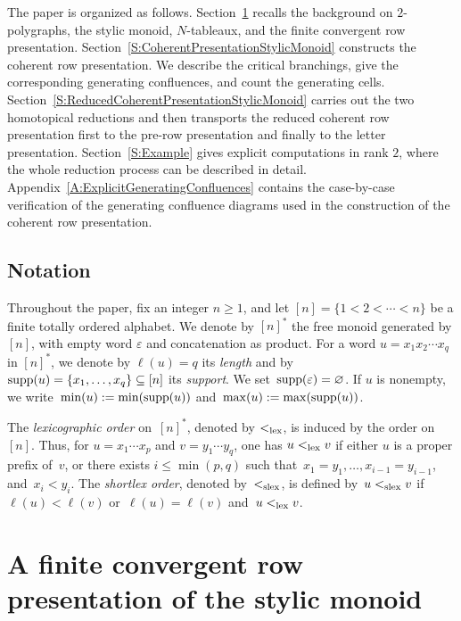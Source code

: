 \documentclass[a4paper, twoside, 11pt, english]{article}
\begin{document}
The paper is organized as follows. Section~\ref{S:RowPresentationStylicMonoid} recalls the background on
$2$-polygraphs, the stylic monoid, $N$-tableaux, and the finite convergent row
presentation. 
Section~\ref{S:CoherentPresentationStylicMonoid} constructs the coherent row
presentation. We describe the critical branchings, give the corresponding
generating confluences, and count the generating cells.
Section~\ref{S:ReducedCoherentPresentationStylicMonoid} carries out the two
homotopical reductions and then transports the reduced coherent row presentation
first to the pre-row presentation and finally to the letter presentation.
Section~\ref{S:Example} gives explicit computations in rank $2$, where the whole
reduction process can be described in detail. 
Appendix~\ref{A:ExplicitGeneratingConfluences} contains the
case-by-case verification of the generating confluence diagrams used in the
construction of the coherent row presentation.


\subsection*{Notation}

Throughout the paper, fix an integer $n\geq 1$, and let $[n]=\{1<2<\cdots<n\}$ be a finite totally ordered alphabet. We denote by $[n]^\ast$ the free monoid generated by $[n]$, with empty word $\varepsilon$ and concatenation as product. For a word $u=x_1x_2\cdots x_q$ in $[n]^\ast$, we denote by $\ell(u)=q$ its \emph{length} and by~$\operatorname{supp}(u)=\{x_1,\dots,x_q\}\subseteq [n]$ its \emph{support}. We set~$\operatorname{supp}(\varepsilon)=\varnothing$. If $u$ is nonempty, we write~$\min(u):=\min(\operatorname{supp}(u))$ and~$\max(u):=\max(\operatorname{supp}(u))$.

The \emph{lexicographic order} on~$[n]^\ast$, denoted by
$<_{\mathrm{lex}}$, is induced by the order on~$[n]$. Thus, for
$u=x_1\cdots x_p$ and $v=y_1\cdots y_q$, one has
$u<_{\mathrm{lex}}v$ if either $u$ is a proper prefix of~$v$, or there exists
$i\leq\min(p,q)$ such that~$
x_1=y_1,\ldots,x_{i-1}=y_{i-1}$, and~$x_i<y_i$.
The \emph{shortlex order}, denoted by~$<_{\mathrm{slex}}$, is defined by~$u<_{\mathrm{slex}}v$ if~$\ell(u)<\ell(v)$ or~$\ell(u)=\ell(v)$ and~$u<_{\mathrm{lex}}v$.



\section{A finite convergent row presentation of the stylic monoid}
\label{S:RowPresentationStylicMonoid}
\end{document}

